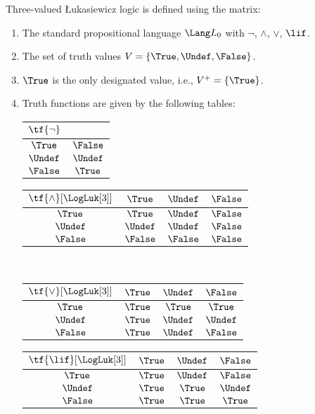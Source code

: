 \documentclass[../../../include/open-logic-section]{subfiles}
\begin{document}
\begin{defn}
Three-valued \L ukasiewicz logic is defined using the matrix:
\begin{enumerate}
  \item The standard propositional language $\Lang L_0$ with
  $\lnot$, $\land$, $\lor$, $\lif$.
  \item The set of truth values $V = \{\True, \Undef, \False\}$.
  \item $\True$ is the only designated value, i.e., $V^+ = \{\True\}$.
  \item Truth functions are given by the following tables:
  \begin{center}
    \begin{tabular}{c|c} 
      $\tf{\lnot}$ & \\ 
      \hline  
      $\True$ & $\False$ \\ 
      $\Undef$ & $\Undef$ \\
      $\False$ & $\True$ 
    \end{tabular}
    \quad
    \begin{tabular}{c|ccc} 
      $\tf{\land}[\LogLuk[3]]$ & $\True$ & $\Undef$ & $\False$ \\ 
      \hline 
      $\True$ & $\True$ & $\Undef$ & $\False$ \\ 
      $\Undef$ & $\Undef$ & $\Undef$ & $\False$\\ 
      $\False$ & $\False$ & $\False$ & $\False$ 
    \end{tabular}
    \\[2ex]
    \begin{tabular}{c|ccc} 
      $\tf{\lor}[\LogLuk[3]]$ & $\True$ & $\Undef$ & $\False$ \\ 
      \hline 
      $\True$ & $\True$ & $\True$ & $\True$ \\ 
      $\Undef$ & $\True$ & $\Undef$ & $\Undef$ \\
      $\False$ & $\True$ & $\Undef$ & $\False$ 
    \end{tabular}
    \quad
    \begin{tabular}{c|ccc} 
      $\tf{\lif}[\LogLuk[3]]$ & $\True$ & $\Undef$ & $\False$ \\ 
      \hline 
      $\True$ & $\True$ & $\Undef$ & $\False$ \\ 
      $\Undef$ & $\True$ & $\True$ & $\Undef$  \\ 
      $\False$ & $\True$ & $\True$ & $\True$ 
    \end{tabular}
  \end{center} 
\end{enumerate}
\end{defn}
\end{document}
